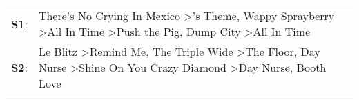 \begin{supertabular}{p{0.03\textwidth}p{0.92\textwidth}}
 \textbf{S1}:  &                              There's No Crying In Mexico\textsuperscript{} \textgreater {}'s Theme\textsuperscript{}, \enspace Wappy Sprayberry\textsuperscript{} \textgreater \enspace All In Time\textsuperscript{} \textgreater \enspace Push the Pig\textsuperscript{}, \enspace Dump City\textsuperscript{} \textgreater \enspace All In Time\textsuperscript{}  \enspace  \\
 \textbf{S2}:  &  Le Blitz\textsuperscript{} \textgreater \enspace Remind Me\textsuperscript{}, \enspace The Triple Wide\textsuperscript{} \textgreater \enspace The Floor\textsuperscript{}, \enspace Day Nurse\textsuperscript{} \textgreater \enspace Shine On You Crazy Diamond\textsuperscript{} \textgreater \enspace Day Nurse\textsuperscript{}, \enspace Booth Love\textsuperscript{}  \enspace  \\
\end{supertabular}
